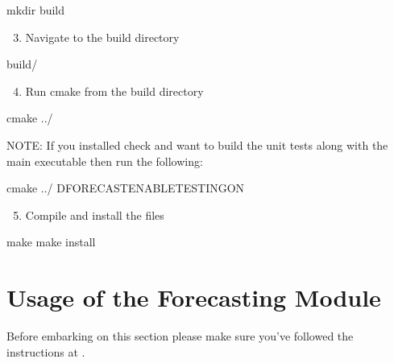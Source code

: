 \documentclass[letterpaper,10pt,english]{sphinxmanual}
\begin{document}
\begin{sphinxVerbatim}[commandchars=\\\{\}]
mkdir build
\end{sphinxVerbatim}
\begin{enumerate}
\setcounter{enumi}{2}
\item {} 
Navigate to the build directory

\end{enumerate}

\begin{sphinxVerbatim}[commandchars=\\\{\}]
 build/
\end{sphinxVerbatim}
\begin{enumerate}
\setcounter{enumi}{3}
\item {} 
Run cmake from the build directory

\end{enumerate}

\begin{sphinxVerbatim}[commandchars=\\\{\}]
cmake ../
\end{sphinxVerbatim}

NOTE: If you installed check and want to build the unit tests along with the main executable then run the following:

\begin{sphinxVerbatim}[commandchars=\\\{\}]
cmake ../ \PYGZhy{}DFORECAST\PYGZus{}ENABLE\PYGZus{}TESTINGON
\end{sphinxVerbatim}
\begin{enumerate}
\setcounter{enumi}{4}
\item {} 
Compile and install the files

\end{enumerate}

\begin{sphinxVerbatim}[commandchars=\\\{\}]
make
make install
\end{sphinxVerbatim}


\chapter{Usage of the Forecasting Module}
\label{\detokenize{usage:usage}}\label{\detokenize{usage::doc}}\label{\detokenize{usage:usage-of-the-forecasting-module}}
Before embarking on this section please make sure you've followed the instructions
at {\hyperref[\detokenize{build::doc}]{}}.
\end{document}
